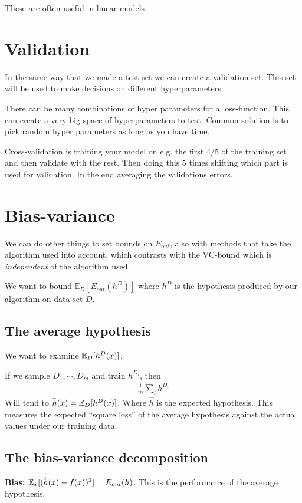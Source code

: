\documentclass{article}
\begin{document}
  These are often useful in linear models. 

\section{Validation}
  In the same way that we made a test set we can create a validation set. This set will be used to make decisions on different hyperparameters.

  There can be many combinations of hyper parameters for a loss-function. This can create a very big space of hyperparameters to test.
  Common solution is to pick random hyper parameters as long as you have time.

  Cross-validation is training your model on e.g. the first 4/5 of the training set and then validate with the rest.
  Then doing this 5 times shifting which part is used for validation.
  In the end averaging the validations errors.


\section{Bias-variance}
  We can do other things to set bounds on $E_{out}$, also with methods that take the algorithm used into account, which contrasts with the VC-bound which is \emph{independent} of the algorithm used.

  We want to bound $\mathbb{E}_D[E_{out}(h^D)]$ where $h^D$ is the hypothesis produced by our algorithm on data set $D$. 

  \subsection{The average hypothesis}
    We want to examine $\mathbb{E}_D[h^D(x)]$. 

    If we sample $D_1, \cdots, D_m$ and train $h^{D_i}$, then
    \begin{align}
      \frac{1}{m}\sum_{i}h^{D_i}
    \end{align}
    Will tend to $\bar{h}(x) = \mathbb{E}_D[h^D(x)]$. Where $\hat{h}$ is the expected hypothesis. This measures the expected ``square loss'' of the average hypothesis against the actual values under our training data.

  \subsection{The bias-variance decomposition}

    \textbf{Bias:} $\mathbb{E}_x[
      (\hat{h}(x) - f(x))^2
    ] = E_{out}(\bar{h})$. This is the performance of the average hypothesis.
\end{document}
